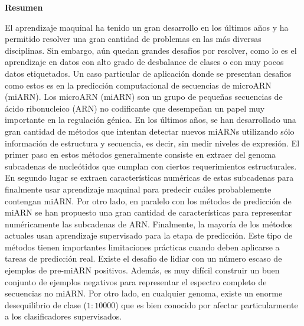 \newpage
\thispagestyle{fancy}
\vspace{3cm}
\begin{center}
{\huge \textbf{Resumen}}
\end{center}
\vspace{1cm}

El aprendizaje maquinal ha tenido un gran desarrollo en los últimos años y ha permitido resolver una gran cantidad de problemas en las más diversas disciplinas.
Sin embargo, aún quedan grandes desafíos por resolver, como lo es el aprendizaje en datos con alto grado de desbalance de clases o con muy pocos datos
etiquetados. Un caso particular de aplicación donde se presentan desafios como estos es en la predicción computacional de secuencias de microARN (miARN).  Los
microARN (miARN) son un grupo de pequeñas secuencias de ácido ribonucleico (ARN) no codificante que desempeñan un papel muy importante en la regulación génica.
En los últimos años, se han desarrollado una gran cantidad de métodos que intentan detectar nuevos miARNs utilizando sólo información de estructura y secuencia,
es decir, sin medir niveles de expresión. El primer paso en estos métodos generalmente consiste en extraer del genoma subcadenas de nucleótidos que cumplan con
ciertos requerimientos estructurales. En segundo lugar se extraen características numéricas de estas subcadenas para finalmente usar aprendizaje maquinal para
predecir cuáles probablemente contengan miARN. Por otro lado, en paralelo con los métodos de predicción de miARN se han propuesto una gran cantidad de
características para representar numéricamente las subcadenas de ARN. Finalmente, la mayoría de los métodos actuales usan aprendizaje supervisado para la etapa
de predicción. Este tipo de métodos tienen importantes limitaciones prácticas cuando deben aplicarse a tareas de predicción real.  Existe el desafío de lidiar
con un número escaso de ejemplos de pre-miARN positivos. Además, es muy difícil construir un buen conjunto de ejemplos negativos para representar el espectro
completo de secuencias no miARN. Por otro lado, en cualquier genoma, existe un enorme desequilibrio de clase ($1:10000$) que es bien conocido por afectar
particularmente a los clasificadores supervisados.

